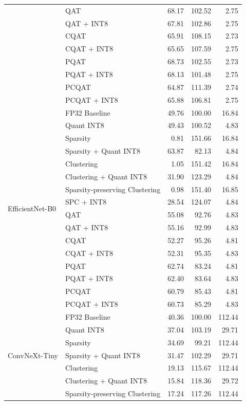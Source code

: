 \begin{table}[htbp]
{\begin{tabular}{llrrr}
  & QAT & 68.17 & 102.52 & 2.75 \\
  & QAT + INT8 & 67.81 & 102.86 & 2.75 \\
  & CQAT & 65.91 & 108.15 & 2.73 \\
  & CQAT + INT8 & 65.65 & 107.59 & 2.75 \\
  & PQAT & 68.73 & 102.55 & 2.73 \\
  & PQAT + INT8 & 68.13 & 101.48 & 2.75 \\
  & PCQAT & 64.87 & 111.39 & 2.74 \\
  & PCQAT + INT8 & 65.88 & 106.81 & 2.75 \\
\midrule
\multirow{16}{*}{EfficientNet-B0}
  & FP32 Baseline & 49.76 & 100.00 & 16.84 \\
  & Quant INT8 & 49.43 & 100.52 & 4.83 \\
  & Sparsity & 0.81 & 151.66 & 16.84 \\
  & Sparsity + Quant INT8 & 63.87 & 82.13 & 4.84 \\
  & Clustering & 1.05 & 151.42 & 16.84 \\
  & Clustering + Quant INT8 & 31.90 & 123.29 & 4.84 \\
  & Sparsity-preserving Clustering & 0.98 & 151.40 & 16.85 \\
  & SPC + INT8 & 28.54 & 124.07 & 4.84 \\
  & QAT & 55.08 & 92.76 & 4.83 \\
  & QAT + INT8 & 55.16 & 92.99 & 4.83 \\
  & CQAT & 52.27 & 95.26 & 4.81 \\
  & CQAT + INT8 & 52.31 & 95.35 & 4.83 \\
  & PQAT & 62.74 & 83.24 & 4.81 \\
  & PQAT + INT8 & 62.40 & 83.64 & 4.83 \\
  & PCQAT & 60.79 & 85.43 & 4.81 \\
  & PCQAT + INT8 & 60.73 & 85.29 & 4.83 \\
\midrule
\multirow{16}{*}{ConvNeXt-Tiny}
  & FP32 Baseline & 40.36 & 100.00 & 112.44 \\
  & Quant INT8 & 37.04 & 103.19 & 29.71 \\
  & Sparsity & 34.69 & 99.21 & 112.44 \\
  & Sparsity + Quant INT8 & 31.47 & 102.29 & 29.71 \\
  & Clustering & 19.13 & 115.67 & 112.44 \\
  & Clustering + Quant INT8 & 15.84 & 118.36 & 29.72 \\
  & Sparsity-preserving Clustering & 17.24 & 117.26 & 112.44 \\

\end{tabular}}
\end{table}
